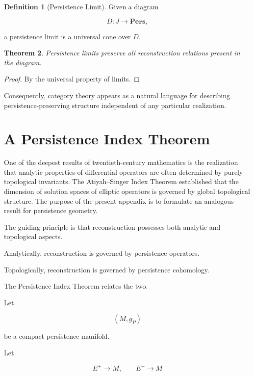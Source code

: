 \documentclass[12pt,oneside]{article}
\newtheorem{theorem}{Theorem}[section] \newtheorem{lemma}[theorem]{Lemma} \newtheorem{proposition}[theorem]{Proposition} \newtheorem{corollary}[theorem]{Corollary}
\theoremstyle{definition}
\newtheorem{definition}[theorem]{Definition} \newtheorem{axiom}[theorem]{Axiom} \newtheorem{remark}[theorem]{Remark} \newtheorem{example}[theorem]{Example}
\begin{document}
\begin{definition}[Persistence Limit]

Given a diagram

\[
D:J\to\mathbf{Pers},
\]

a persistence limit is a universal cone over \(D\).

\end{definition}

\begin{theorem}

Persistence limits preserve all reconstruction relations present in the diagram.

\end{theorem}

\begin{proof}

By the universal property of limits.

\end{proof}

Consequently, category theory appears as a natural language for describing persistence-preserving structure independent of any particular realization.

\section{A Persistence Index Theorem}

One of the deepest results of twentieth-century mathematics is the realization that analytic properties of differential operators are often determined by purely topological invariants. The Atiyah--Singer Index Theorem established that the dimension of solution spaces of elliptic operators is governed by global topological structure. The purpose of the present appendix is to formulate an analogous result for persistence geometry.

The guiding principle is that reconstruction possesses both analytic and topological aspects.

Analytically, reconstruction is governed by persistence operators.

Topologically, reconstruction is governed by persistence cohomology.

The Persistence Index Theorem relates the two.

Let

\[
(M,g_P)
\]

be a compact persistence manifold.

Let

\[
E^+
\rightarrow M,
\qquad
E^-
\rightarrow M
\]
\end{document}
